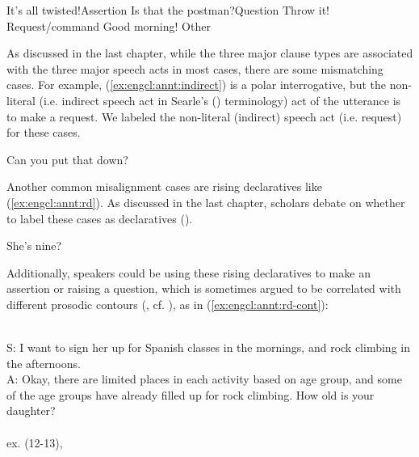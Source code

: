 \bxl\label{ex:engcl:annt:sp:a} It’s all twisted!\hfill	Assertion
\ex\label{ex:engcl:annt:sp:q} Is that the postman?\hfill		Question
\ex\label{ex:engcl:annt:sp:r} Throw it!	\hfill		Request/command
\ex \label{ex:engcl:annt:sp:o} Good morning! \hfill Other
\exl
\eex

As discussed in the last chapter, while the three major clause types are associated with the three major speech acts in most cases, there are some mismatching cases. For example, (\ref{ex:engcl:annt:indirect}) is a polar interrogative, but the non-literal (i.e. indirect speech act in Searle's (\cite*{searle1975indirect}) terminology) act of the utterance is to make a request. We labeled the non-literal (indirect) speech act (i.e. request) for these cases.

Can you put that down?
\eex 

Another common misalignment cases are rising declaratives like (\ref{ex:engcl:annt:rd}). As discussed in the last chapter, scholars debate on whether to label these cases as declaratives (\cite{gunlogson2008,  farkasroelofsen2017}). 

She's nine?
\eex

Additionally, speakers could be using these rising declaratives to make an assertion or raising a question, which is sometimes argued to be correlated with different prosodic contours (\cite{jeong2018}, cf. \cite{goodhue2021rd}), as in (\ref{ex:engcl:annt:rd-cont}):

\bxl
\label{ex:engcl:annt:rd:a}
\\
S: I want to sign her up for Spanish classes in the mornings, and rock climbing in the afternoons.\\
A: Okay, there are limited places in each activity based on age group, and some of the age groups have already filled up for rock climbing. How old is your daughter?\\
\ex 
 \label{ex:engcl:annt:rd:q}
\\
\exl
\hspace*{\fill}\hfill ex. (12-13), \cite[p.955]{goodhue2021rd}
\eex

